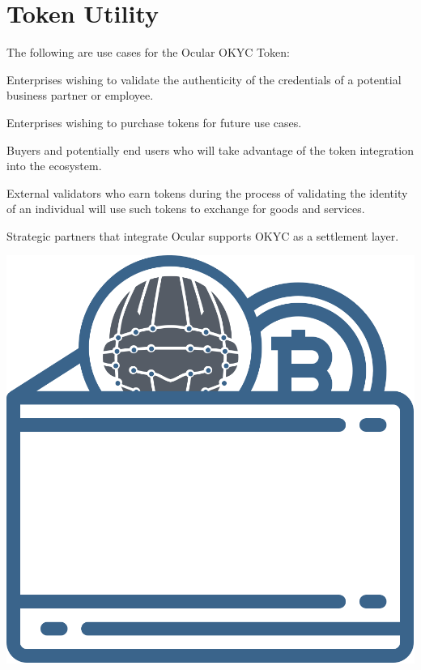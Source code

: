 \documentclass[a4paper]{article}
\let\tempone\itemize
\let\temptwo\enditemize
\renewenvironment{itemize}{\tempone\addtolength{\itemsep}{-5pt}}{\temptwo}
\begin{document}
\section{Token Utility}
The following are use cases for the Ocular OKYC Token: 
\begin{itemize}
  \item Enterprises wishing to validate the authenticity of the credentials of a potential business partner or employee.
  \item Enterprises wishing to purchase tokens for future use cases.
  \item Buyers and potentially end users who will take advantage of the token integration into the ecosystem.
  \item External validators who earn tokens during the process of validating the identity of an individual will use such tokens to exchange for goods and services.
  \item Strategic partners that integrate Ocular supports OKYC as a settlement layer. 
\end{itemize}


\centerline{\includegraphics[width=1.0\textwidth]{ocular-ewallet}}
\end{document}
